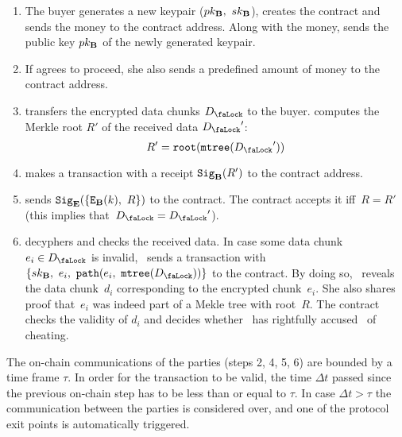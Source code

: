 \begin{enumerate}
\item The buyer generates a new keypair ($pk_{\mathbf{B}},\ sk_{\mathbf{B}}$), creates the contract and sends the money to the contract address. Along with the money,  sends the public key $pk_{\mathbf{B}}$ of the newly generated keypair.
\item If  agrees to proceed, she also sends a predefined amount of money to the contract address.
\item {} transfers the encrypted data chunks $\Lock$ to the buyer.  computes the Merkle root $R'$ of the received data $\Lock'$:
\begin{equation}
R' = \Root(\MerkleTree(\Lock'))
\end{equation}
\item {} makes a transaction with a receipt $\mathtt{Sig}_{\mathbf{B}}(R')$ to the contract address.
\item {} sends $\Sign_\Party{E}(\{\Encrypt_\Party{B}(k),\ R\})$ to the contract. The contract accepts it iff~$R=R'$ (this implies that~$\Lock=\Lock'$).
\item {} decyphers and checks the received data. In case some data chunk $e_i \in \Lock$ is invalid, ~sends a transaction with~$\{\SecretKey{B},\ e_i,\ \Path(e_i,\ \MerkleTree(\Lock))\}$ to the contract. By doing so, ~reveals the data chunk~$d_i$ corresponding to the encrypted chunk~$e_i$.  She also shares proof that~$e_i$ was indeed part of a  Mekle tree with root~$R$. The contract checks the validity of $d_i$ and decides whether ~has rightfully accused~ of cheating.
\end{enumerate}

The on-chain communications of the parties (steps 2, 4, 5, 6) are bounded by a time frame $\tau$. In order for the transaction to be valid, the time $\Delta t$ passed since the previous on-chain step has to be less than or equal to $\tau$. In case $\Delta t > \tau$ the communication between the parties is considered over, and one of the protocol exit points is automatically triggered.

